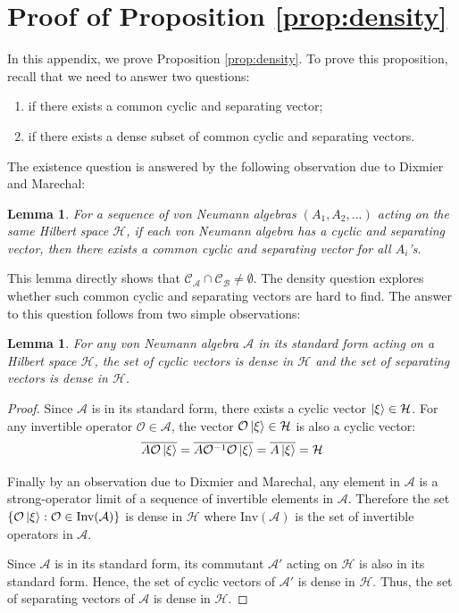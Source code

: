 \documentclass[a4paper,11pt]{article}
\newtheorem{lemma}[theorem]{Lemma}
\theoremstyle{definition}
\begin{document}
\section{Proof of Proposition \ref{prop:density}}\label{app:proof}
In this appendix, we prove Proposition \ref{prop:density}. To prove this proposition, recall that we need to answer two questions:
\begin{enumerate}
    \item if there exists a common cyclic and separating vector;
    \item if there exists a dense subset of common cyclic and separating vectors.
\end{enumerate}
The existence question is answered by the following observation due to Dixmier and Marechal\cite{dixmiermarechal}:
\begin{lemma}
    For a sequence of von Neumann algebras $(A_1,A_2,...)$ acting on the same Hilbert space $\mathcal{H}$, if each von Neumann algebra has a cyclic and separating vector, then there exists a common cyclic and separating vector for all $A_i$'s. 
\end{lemma}
This lemma directly shows that $\mathcal{C}_\mathcal{A}\cap\mathcal{C}_\mathcal{B} \neq \emptyset$. The density question explores whether such common cyclic and separating vectors are hard to find. The answer to this question follows from two simple observations:
\begin{lemma}
    For any von Neumann algebra $\mathcal{A}$ in its standard form acting on a Hilbert space $\mathcal{H}$, the set of cyclic vectors is dense in $\mathcal{H}$ and the set of separating vectors is dense in $\mathcal{H}$.
\end{lemma}
\begin{proof}
    Since $\mathcal{A}$ is in its standard form, there exists a cyclic vector $\ket{\xi}\in\mathcal{H}$. For any invertible operator $\mathcal{O}\in\mathcal{A}$, the vector $\mathcal{O}\ket{\xi}\in\mathcal{H}$ is also a cyclic vector:
    \begin{equation}
        \overline{A\mathcal{O}\ket{\xi}} = \overline{A\mathcal{O}^{-1}\mathcal{O}\ket{\xi}} = \overline{A\ket{\xi}} = \mathcal{H}
    \end{equation}
    
    Finally by an observation due to Dixmier and Marechal\cite{dixmiermarechal}, any element in $\mathcal{A}$ is a strong-operator limit of a sequence of invertible elements in $\mathcal{A}$. Therefore the set $\{\mathcal{O}\ket{\xi}: \mathcal{O}\in \text{Inv}(\mathcal{A})\}$ is dense in $\mathcal{H}$ where $\text{Inv}(\mathcal{A})$ is the set of invertible operators in $\mathcal{A}$.

    Since $\mathcal{A}$ is in its standard form, its commutant $\mathcal{A}'$ acting on $\mathcal{H}$ is also in its standard form. Hence, the set of cyclic vectors of $\mathcal{A}'$ is dense in $\mathcal{H}$. Thus, the set of separating vectors of $\mathcal{A}$ is dense in $\mathcal{H}$.
\end{proof}
\end{document}
